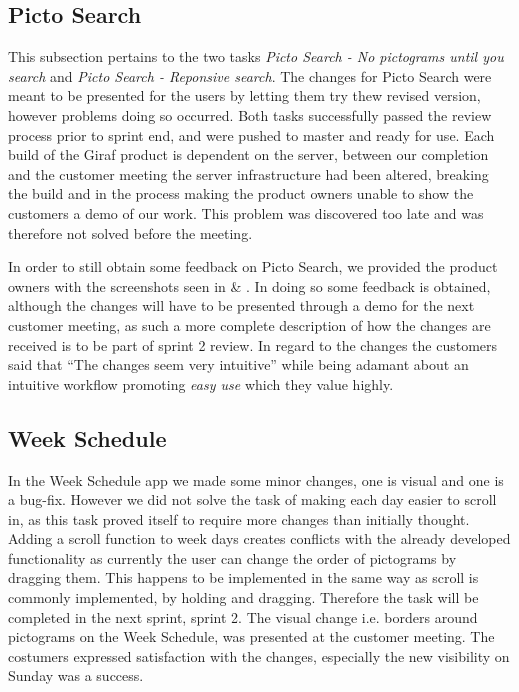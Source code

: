 \subsection{Picto Search}
This subsection pertains to the two tasks \textit{Picto Search - No pictograms until you search} and \textit{Picto Search - Reponsive search}.
The changes for Picto Search were meant to be presented for the users by letting them try thew revised version, however problems doing so occurred.
Both tasks successfully passed the review process prior to sprint end, and were pushed to master and ready for use.
Each build of the Giraf product is dependent on the server, between our completion and the customer meeting the server infrastructure had been altered, breaking the build and in the process making the product owners unable to show the customers a demo of our work.
This problem was discovered too late and was therefore not solved before the meeting.

In order to still obtain some feedback on Picto Search, we provided the product owners with the screenshots seen in  \& .
In doing so some feedback is obtained, although the changes will have to be presented through a demo for the next customer meeting, as such a more complete description of how the changes are received is to be part of sprint 2 review.   
In regard to the changes the customers said that \enquote{The changes seem very intuitive} while being adamant about an intuitive workflow promoting \textit{easy use} which they value highly.

\subsection{Week Schedule}
In the Week Schedule app we made some minor changes, one is visual and one is a bug-fix. 
However we did not solve the task of making each day easier to scroll in, as this task proved itself to require more changes than initially thought.
Adding a scroll function to week days creates conflicts with the already developed functionality as currently the user can change the order of pictograms by dragging them.
This happens to be implemented in the same way as scroll is commonly implemented, by holding and dragging.
Therefore the task will be completed in the next sprint, sprint 2.
The visual change i.e. borders around pictograms on the Week Schedule, was presented at the customer meeting.
The costumers expressed satisfaction with the changes, especially the new visibility on Sunday was a success.
